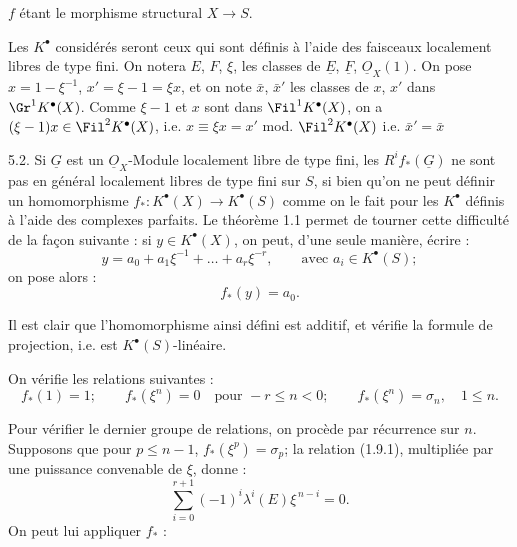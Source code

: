 
$f$
étant le morphisme structural $X\longrightarrow S$.

Les $K^{\bullet}$ considérés seront ceux qui sont définis à l'aide des faisceaux localement libres de type fini. On notera $E$, $F$, $\xi$, les classes de $\underline{E}$, $\underline{F}$, $\underline{O}_X(1)$. On pose $x=1-\xi^{-1}$, $x'=\xi-1=\xi x$, et on note $\bar x$, $\bar x'$ les classes de $x$, $x'$ dans $\Gr^1K^{\bullet}(X)$. Comme $\xi-1$ et $x$ sont dans $\Fil^1K^{\bullet}(X)$, on a $(\xi-1)x\in\Fil^2K^{\bullet}(X)$, i.e. $x\equiv \xi x=x'$ mod. $\Fil^2K^{\bullet}(X)$ i.e. $\bar x'= \bar x$

5.2.
Si $\underline{G}$ est un $\underline{O}_X$-Module localement libre de type fini, les $R^if_*(\underline{G})$ ne sont pas en général localement libres de type fini sur $S$, si bien qu'on ne peut définir un homomorphisme $f_*:K^{\bullet}(X)\to K^{\bullet}(S)$ comme on le fait pour les $K^{\bullet}$ définis à l'aide des complexes parfaits. Le théorème 1.1 permet de tourner cette difficulté de la façon suivante : si $y\in K^{\bullet}(X)$, on peut, d'une seule manière, écrire :
\begin{equation}\tag{5.2.1}
  y=a_0+a_1\xi^{-1}+\ldots+a_r\xi^{-r},\qquad \text{avec } a_i\in K^{\bullet}(S);
\end{equation}
on pose alors :
\begin{equation}\tag{5.2.2}
  f_*(y)=a_0 .
\end{equation}

Il est clair que l'homomorphisme ainsi défini est additif, et vérifie la formule de projection, i.e. est $K^{\bullet}(S)$-linéaire.

On vérifie les relations suivantes :
\begin{equation}\tag{5.2.3}
  f_*(1)=1;\qquad
  f_*(\xi^n)=0\quad\text{pour }-r\le n<0;\qquad
  f_*(\xi^n)=\sigma_n,
  \quad 1\le n .
\end{equation}

Pour vérifier le dernier groupe de relations, on procède par récurrence sur $n$. Supposons que pour $p\le n-1$, $f_*(\xi^p)=\sigma_p$; la relation (1.9.1), multipliée par une puissance convenable de $\xi$, donne :
\[
  \sum_{i=0}^{r+1}(-1)^i\lambda^i(E)\xi^{\,n-i}=0 .
\]
On peut lui appliquer $f_*$ :
